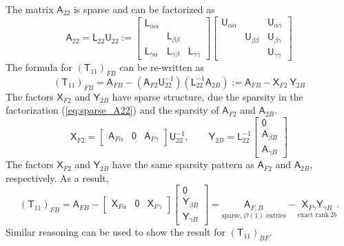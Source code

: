 \documentclass[10pt,a4paper]{amsart}
\newcommand{\mtx}[1]{\bm{\mathsf{#1}}}
\begin{document}
The matrix $\mtx A_{22}$ is sparse and can be factorized as
\begin{equation}
\mtx A_{22} = \mtx L_{22} \mtx U_{22} := 
\begin{bmatrix} \mtx L_{\alpha \alpha}\\
& \mtx L_{\beta \beta}\\
\mtx L_{\gamma \alpha} & \mtx L_{\gamma \beta} & \mtx L_{\gamma \gamma}\end{bmatrix} 
\begin{bmatrix} \mtx U_{\alpha \alpha} & & \mtx U_{\alpha \gamma}\\
& \mtx U_{\beta \beta} & \mtx U_{\beta \gamma}\\
 &  & \mtx U_{\gamma \gamma}\end{bmatrix} 
 \label{eq:sparse_A22}
\end{equation}
The formula for ${\left( \mtx T_{11} \right)}_{FB}$ can be re-written as
\begin{equation}
{\left( \mtx T_{11} \right)}_{FB} = \mtx A_{FB}
 - {\left( \mtx A_{F2} \mtx U_{22}^{-1}\right)}
 {\left( \mtx L_{22}^{-1} \mtx A_{2B}\right)}
:= \mtx A_{FB} - {\mtx X_{F2}}\ {\mtx Y_{2B}}
\end{equation}
The factors $\mtx X_{F2}$ and $\mtx Y_{2B}$ have sparse
structure, due the sparsity in the factorization (\ref{eq:sparse_A22})
and the sparsity of $\mtx A_{F2}$ and $\mtx A_{2B}$.
\begin{equation}
\mtx X_{F2} = \begin{bmatrix} \mtx A_{F\alpha}& \mtx 0 & \mtx A_{F\gamma}\end{bmatrix} \mtx U_{22}^{-1},\qquad \mtx Y_{2B} 
= \mtx L_{22}^{-1} \begin{bmatrix} \mtx 0\\ \mtx A_{\beta B}\\ \mtx A_{\gamma B}\end{bmatrix}
\end{equation}
The factors $\mtx X_{F2}$ and $\mtx Y_{2B}$ have the same sparsity pattern as $\mtx A_{F2}$ and $\mtx A_{2B}$, respectively.
As a result,
\begin{equation}
{\left( \mtx T_{11} \right)}_{FB} = \mtx A_{FB} - \begin{bmatrix} \mtx X_{F\alpha}& \mtx 0 & \mtx X_{F\gamma}\end{bmatrix} \begin{bmatrix} \mtx 0\\ \mtx Y_{\beta B}\\ \mtx Y_{\gamma B}\end{bmatrix} = \underset{\text{sparse, $\mathcal O(1)$ entries}}{\mtx A_{F,B}} - 
\underset{\text{exact rank}\ 2b}{\mtx X_{F\gamma} \mtx Y_{\gamma B}}.
\end{equation}
Similar reasoning can be used to show the result for $\left( \mtx T_{11} \right)_{BF}$.
\end{document}
